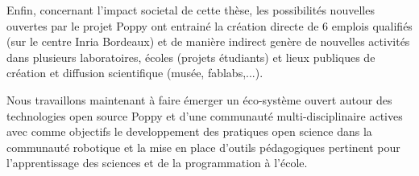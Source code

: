 Enfin, concernant l'impact societal de cette thèse, les possibilités nouvelles ouvertes par le projet Poppy ont entrainé la création directe de 6 emplois qualifiés (sur le centre Inria Bordeaux) et de manière indirect genère de nouvelles activités dans plusieurs laboratoires, écoles (projets étudiants) et lieux publiques de création et diffusion scientifique (musée, fablabs,...).

Nous travaillons maintenant à faire émerger un éco-système ouvert autour des technologies open source Poppy et d'une communauté multi-disciplinaire actives avec comme objectifs le developpement des pratiques open science dans la communauté robotique et la mise en place d'outils pédagogiques pertinent pour l'apprentissage des sciences et de la programmation à l'école.





